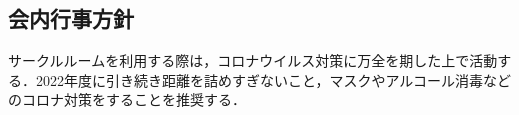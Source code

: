 \subsection*{会内行事方針}


サークルルームを利用する際は，コロナウイルス対策に万全を期した上で活動する．2022年度に引き続き距離を詰めすぎないこと，マスクやアルコール消毒などのコロナ対策をすることを推奨する．
